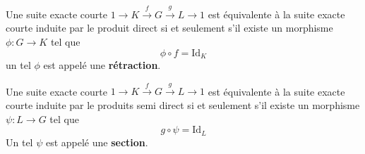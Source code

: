 \begin{proposition}
	Une suite exacte courte $1 \to K \overset{f}{\to} G \overset{g}{\to} L \to 1$ est équivalente à la suite exacte courte induite par le produit direct si et seulement s'il existe un morphisme $\phi : G \to K$ tel que
	\[
	\phi \circ f = \mathrm{Id}_K
	\]
	un tel $\phi$ est appelé une \textbf{rétraction}.
\end{proposition}


\begin{proposition}
	Une suite exacte courte $1 \to K \overset{f}{\to} G \overset{g}{\to} L \to 1$ est équivalente à la suite exacte courte induite par le produits semi direct si et seulement s'il existe un morphisme $\psi :L \to G $ tel que
	\[
	g \circ \psi = \mathrm{Id}_L
	\]
	Un tel $\psi$ est appelé une \textbf{section}.
\end{proposition}

